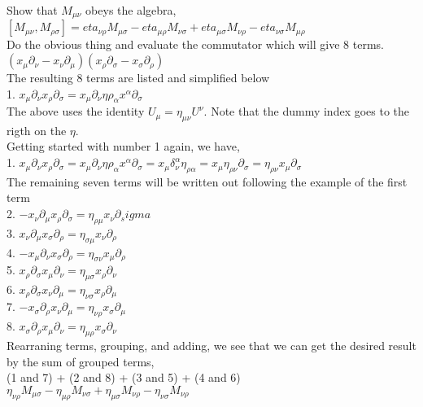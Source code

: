 \documentclass[prb,preprint]
{revtex4-1}
\begin{document}
Show that $M_{\mu\nu}$ obeys the algebra, 
$\left[M_{\mu\nu}, M_{\rho\sigma}\right] = eta_{\nu\rho}M_{\mu\sigma} - eta_{\mu\rho}M_{\nu\sigma} + eta_{\mu\sigma}M_{\nu\rho} - eta_{\nu\sigma}M_{\mu\rho}$
\\
Do the obvious thing and evaluate the commutator which will give 8 terms.
\\
$\left(x_\mu \partial_\nu - x_\nu \partial_\mu\right)\left(x_\rho \partial_\sigma - x_\sigma \partial_\rho\right)$
\\
The resulting 8 terms are listed and simplified below
\\
1.  $x_\mu \partial_\nu x_\rho \partial_\sigma = x_\mu\partial_\nu\eta{\rho_\alpha}x^\alpha \partial_\sigma$
\\
The above uses the identity $U_\mu = \eta_{\mu\nu}U^\nu$.  Note that the dummy index goes to the rigth on the $\eta$.
\\
Getting started with number 1 again, we have,
\\
1.  $x_\mu \partial_\nu x_\rho \partial_\sigma = x_\mu\partial_\nu\eta{\rho_\alpha}x^\alpha \partial_\sigma = x_\mu \delta_\nu^\alpha \eta_{\rho\alpha} = x_\mu \eta_{\rho\nu} \partial_\sigma = \eta_{\rho\nu} x_\mu \partial_\sigma$
\\
The remaining seven terms will be written out following the example of the first term
\\
2.  $-x_\nu \partial_\mu x_\rho \partial_\sigma = \eta_{\rho\mu} x_\nu \partial_sigma$
\\
3.  $x_\nu \partial_\mu x_\sigma \partial_\rho = \eta_{\sigma\mu} x_\nu \partial_\rho$
\\
4.  $-x_\mu \partial_\nu x_\sigma \partial_\rho = \eta_{\sigma\nu} x_\mu \partial_\rho$
\\
5.  $x_\rho \partial_\sigma x_\mu \partial_\nu = \eta_{\mu\sigma} x_\rho \partial_\nu$
\\
6.  $x_\rho \partial_\sigma x_\nu \partial_\mu = \eta_{\nu\sigma} x_\rho \partial_\mu$
\\
7.  $-x_\sigma \partial_\rho x_\nu \partial_\mu = \eta_{\nu\rho} x_\sigma \partial_\mu$
\\
8.  $x_\sigma \partial_\rho x_\mu \partial_\nu = \eta_{\mu\rho} x_\sigma \partial_\nu$
\\
Rearraning terms, grouping, and adding, we see that we can get the desired result by the sum of grouped terms, 
\\
(1 and 7) + (2 and 8) + (3 and 5) + (4 and 6)
\\
$\eta_{\nu\rho}M_{\mu\sigma} - \eta_{\mu\rho}M_{\nu\sigma} + \eta_{\mu\sigma}M_{\nu\rho} - \eta_{\nu\sigma}M_{\nu\rho}$
\end{document}

